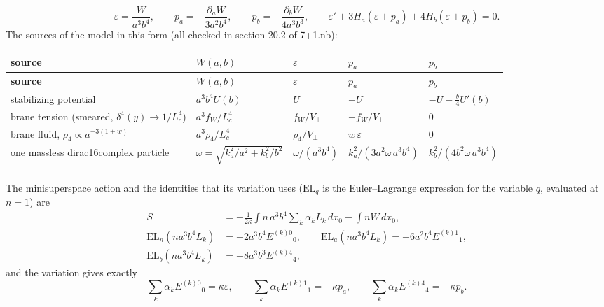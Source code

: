 \documentclass[10pt,a4paper]{article}
\begin{document}
\begin{equation*}
\varepsilon=\frac{W}{a^3b^4},\qquad p_a=-\frac{\partial_aW}{3a^2b^4},\qquad p_b=-\frac{\partial_bW}{4a^3b^3},\qquad \varepsilon'+3H_a(\varepsilon+p_a)+4H_b(\varepsilon+p_b)=0 .
\end{equation*}
The sources of the model in this form (all checked in section 20.2 of 7+1.nb):

{\footnotesize
\begin{longtable}{>{\raggedright\arraybackslash}p{}>{\raggedright\arraybackslash}p{}>{\raggedright\arraybackslash}p{}>{\raggedright\arraybackslash}p{}>{\raggedright\arraybackslash}p{}}
\toprule
\textbf{source} & \textbf{$W(a,b)$} & \textbf{$\varepsilon$} & \textbf{$p_a$} & \textbf{$p_b$} \\
\midrule\endfirsthead
\toprule
\textbf{source} & \textbf{$W(a,b)$} & \textbf{$\varepsilon$} & \textbf{$p_a$} & \textbf{$p_b$} \\
\midrule\endhead
\endfoot
\bottomrule\endlastfoot
stabilizing potential & $a^3b^4U(b)$ & $U$ & $-U$ & $-U-\tfrac b4U'(b)$ \\
brane tension (smeared, $\delta^4(y)\to1/L_c^4$) & $a^3f_W/L_c^4$ & $f_W/V_\perp$ & $-f_W/V_\perp$ & $0$ \\
brane fluid, $\rho_4\propto a^{-3(1+w)}$ & $a^3\rho_4/L_c^4$ & $\rho_4/V_\perp$ & $w\,\varepsilon$ & $0$ \\
one massless dirac16complex particle & $\omega=\sqrt{k_a^2/a^2+k_b^2/b^2}$ & $\omega/(a^3b^4)$ & $k_a^2/(3a^2\omega\,a^3b^4)$ & $k_b^2/(4b^2\omega\,a^3b^4)$ \\*
\end{longtable}}
The minisuperspace action and the identities that its variation uses ($\mathrm{EL}_q$ is the Euler–Lagrange expression for the variable $q$, evaluated at $n=1$) are
\begin{align*}
S&=-\frac1{2\kappa}\int n\,a^3b^4\sum_k\alpha_kL_k\,dx_0-\int nW\,dx_0, \\
\mathrm{EL}_n(na^3b^4L_k)&=-2a^3b^4E^{(k)0}{}_0,\qquad \mathrm{EL}_a(na^3b^4L_k)=-6a^2b^4E^{(k)1}{}_1, \\
\mathrm{EL}_b(na^3b^4L_k)&=-8a^3b^3E^{(k)4}{}_4,
\end{align*}
and the variation gives exactly
\begin{equation*}
\sum_k\alpha_kE^{(k)0}{}_0=\kappa\varepsilon,\qquad \sum_k\alpha_kE^{(k)1}{}_1=-\kappa p_a,\qquad \sum_k\alpha_kE^{(k)4}{}_4=-\kappa p_b .
\end{equation*}
\end{document}
